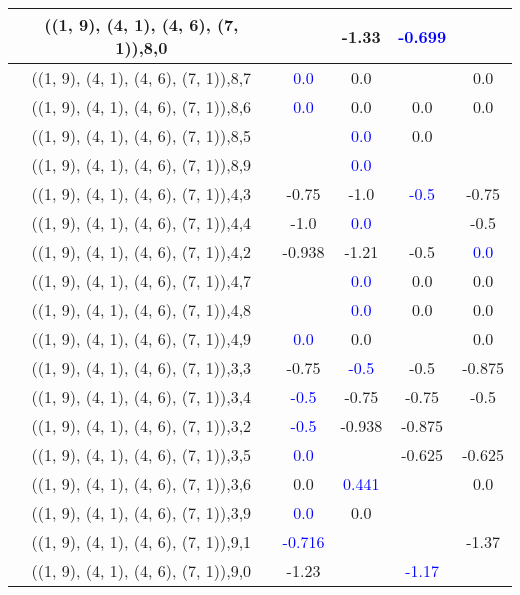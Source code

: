 \documentclass{article}
\begin{document}
\begin{center}
\begin{longtable}{|c|c|c|c|c|}
        	\hline
        	((1, 9), (4, 1), (4, 6), (7, 1)),8,0&&-1.33& \textcolor{blue}{-0.699}&\\
        	\hline
        	((1, 9), (4, 1), (4, 6), (7, 1)),8,7& \textcolor{blue}{0.0}&0.0&&0.0\\
        	\hline
        	((1, 9), (4, 1), (4, 6), (7, 1)),8,6& \textcolor{blue}{0.0}&0.0&0.0&0.0\\
        	\hline
        	((1, 9), (4, 1), (4, 6), (7, 1)),8,5&& \textcolor{blue}{0.0}&0.0&\\
        	\hline
        	((1, 9), (4, 1), (4, 6), (7, 1)),8,9&& \textcolor{blue}{0.0}&&\\
        	\hline
        	((1, 9), (4, 1), (4, 6), (7, 1)),4,3&-0.75&-1.0& \textcolor{blue}{-0.5}&-0.75\\
        	\hline
        	((1, 9), (4, 1), (4, 6), (7, 1)),4,4&-1.0& \textcolor{blue}{0.0}&&-0.5\\
        	\hline
        	((1, 9), (4, 1), (4, 6), (7, 1)),4,2&-0.938&-1.21&-0.5& \textcolor{blue}{0.0}\\
        	\hline
        	((1, 9), (4, 1), (4, 6), (7, 1)),4,7&& \textcolor{blue}{0.0}&0.0&0.0\\
        	\hline
        	((1, 9), (4, 1), (4, 6), (7, 1)),4,8&& \textcolor{blue}{0.0}&0.0&0.0\\
        	\hline
        	((1, 9), (4, 1), (4, 6), (7, 1)),4,9& \textcolor{blue}{0.0}&0.0&&0.0\\
        	\hline
        	((1, 9), (4, 1), (4, 6), (7, 1)),3,3&-0.75& \textcolor{blue}{-0.5}&-0.5&-0.875\\
        	\hline
        	((1, 9), (4, 1), (4, 6), (7, 1)),3,4& \textcolor{blue}{-0.5}&-0.75&-0.75&-0.5\\
        	\hline
        	((1, 9), (4, 1), (4, 6), (7, 1)),3,2& \textcolor{blue}{-0.5}&-0.938&-0.875&\\
        	\hline
        	((1, 9), (4, 1), (4, 6), (7, 1)),3,5& \textcolor{blue}{0.0}&&-0.625&-0.625\\
        	\hline
        	((1, 9), (4, 1), (4, 6), (7, 1)),3,6&0.0& \textcolor{blue}{0.441}&&0.0\\
        	\hline
        	((1, 9), (4, 1), (4, 6), (7, 1)),3,9& \textcolor{blue}{0.0}&0.0&&\\
        	\hline
        	((1, 9), (4, 1), (4, 6), (7, 1)),9,1& \textcolor{blue}{-0.716}&&&-1.37\\
        	\hline
        	((1, 9), (4, 1), (4, 6), (7, 1)),9,0&-1.23&& \textcolor{blue}{-1.17}&\\

\end{longtable}
\end{center}
\end{document}

